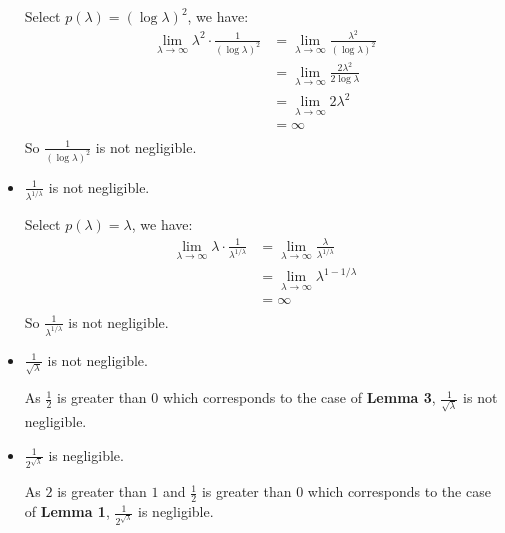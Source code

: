 \documentclass[a4paper,12pt]{article}
\begin{document}
\begin{itemize}
          Select $p(\lambda) = (\log \lambda)^2$, we have:
          \begin{equation}
              \begin{aligned}
                  \lim_{\lambda \to \infty}\lambda^2\cdot \frac{1}{(\log \lambda)^2} & =  \lim_{\lambda \to \infty}\frac{\lambda^2}{(\log \lambda)^2} \\
                                                                                     & = \lim_{\lambda \to \infty}\frac{2\lambda^2}{2\log \lambda}    \\
                                                                                     & = \lim_{\lambda \to \infty} 2\lambda^2                         \\
                                                                                     & = \infty                                                       \\
              \end{aligned}
          \end{equation}
          So $\frac{1}{(\log \lambda)^2}$ is not negligible.
    \item $\frac{1}{\lambda^{1/\lambda}}$ is not negligible.

          Select $p(\lambda) = \lambda$, we have:
          \begin{equation}
              \begin{aligned}
                  \lim_{\lambda \to \infty}\lambda\cdot \frac{1}{\lambda^{1/\lambda}} & = \lim_{\lambda \to \infty}\frac{\lambda}{\lambda^{1/\lambda}} \\
                                                                                      & = \lim_{\lambda \to \infty}\lambda^{1 - 1/\lambda}             \\
                                                                                      & = \infty                                                       \\
              \end{aligned}
          \end{equation}
          So $\frac{1}{\lambda^{1/\lambda}}$ is not negligible.
    \item $\frac{1}{\sqrt{\lambda}}$ is not negligible.

          As $\frac{1}{2}$ is greater than $0$ which corresponds to the case of \textbf{Lemma 3}, $\frac{1}{\sqrt{\lambda}}$ is not negligible.
    \item $\frac{1}{2^{\sqrt{\lambda}}}$ is negligible.

          As $2$ is greater than $1$ and $\frac{1}{2}$ is greater than $0$ which corresponds to the case of \textbf{Lemma 1}, $\frac{1}{2^{\sqrt{\lambda}}}$ is negligible.
\end{itemize}
\end{document}
